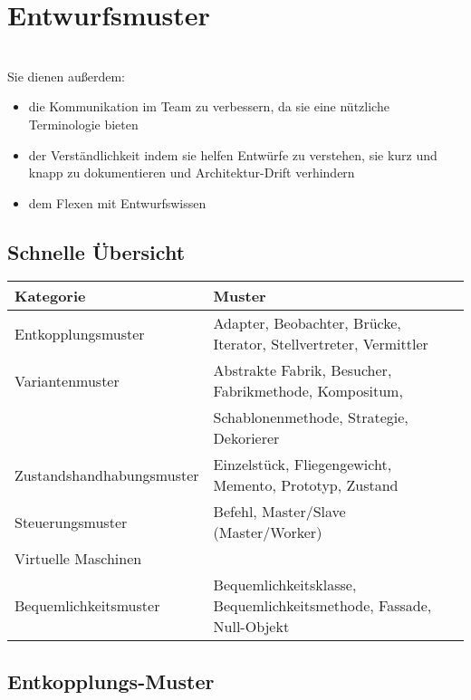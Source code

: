 \section{Entwurfsmuster}
\\
Sie dienen außerdem:
\begin{itemize}
    \item die Kommunikation im Team zu verbessern, da sie eine nützliche Terminologie bieten
    \item der Verständlichkeit indem sie helfen Entwürfe zu verstehen, sie kurz und knapp zu dokumentieren und Architektur-Drift verhindern
    \item dem Flexen mit Entwurfswissen
\end{itemize}

\subsection{Schnelle Übersicht}
\begin{table}[h]
\begin{tabular}{l|l}
\toprule
Kategorie & Muster   \\\midrule
Entkopplungsmuster & Adapter, Beobachter, Brücke, Iterator, Stellvertreter, Vermittler  \\\hline
Variantenmuster & Abstrakte Fabrik, Besucher, Fabrikmethode, Kompositum, \\& Schablonenmethode, Strategie, Dekorierer \\\hline
Zustandshandhabungsmuster & Einzelstück, Fliegengewicht, Memento, Prototyp, Zustand  \\\hline
Steuerungsmuster & Befehl, Master/Slave (Master/Worker)  \\\hline
Virtuelle Maschinen &   \\\hline
Bequemlichkeitsmuster & Bequemlichkeitsklasse, Bequemlichkeitsmethode, Fassade, Null-Objekt \\\bottomrule
\end{tabular}
\end{table}
\newpage
\subsection{Entkopplungs-Muster}
